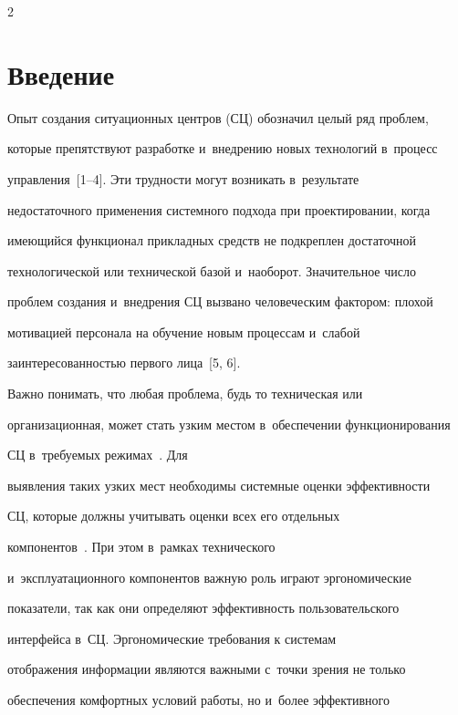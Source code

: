 \begin{multicols}{2}



\label{st\stat}



\section{Введение}

	

     Опыт создания ситуационных центров (СЦ) обозначил целый ряд проблем,

которые препятствуют разработке и~внедрению новых технологий в~процесс

управления~[1--4]. Эти трудности могут возникать в~результате

недостаточного применения системного подхода при проектировании, когда

имеющийся функционал прикладных средств не подкреплен достаточной

технологической или технической базой и~наоборот. Значительное число

проблем создания и~внедрения СЦ вызвано человеческим фактором: плохой

мотивацией персонала на обучение новым процессам и~слабой

заинтересованностью первого лица~[5, 6].



     Важно понимать, что любая проблема, будь то техническая или

организационная, может стать узким местом в~обеспечении функционирования

СЦ в~требуемых режимах~\cite{3-zat, 7-zat}. Для

выявления таких узких мест необходимы системные оценки эффективности

СЦ, которые должны учитывать оценки всех его отдельных

компонентов~\cite{8-zat}. При этом в~рамках технического

и~эксплуатационного компонентов важную роль играют эргономические

показатели, так как они определяют эффективность пользовательского

интерфейса в~СЦ. Эргономические требования к системам

отображения информации являются важными с~точки зрения не только

обеспечения комфортных условий работы, но и~более эффективного


\end{multicols}
